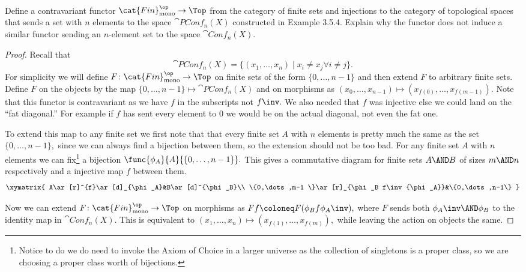 \documentclass[main.tex]{subfiles}
\begin{document}
	\paragraph{}
	\begin{exercise}
		Define a contravariant functor $ \cat{Fin}_{\textrm{mono}}^\op \to
		\Top$ from
		the	category of finite sets and injections to the category of
		topological
		spaces that sends a set with $ n $ elements to the space $
		\cat{PConf}_n(X) $
		constructed in Example 3.5.4. Explain why the functor does not induce a
		similar functor sending an $ n $-element set to the space $ \cat{Conf}_n(X). $
	\end{exercise}

	\begin{proof}
		Recall that
		$$
		\cat{PConf}_n(X)=\{(x_1,\dots,x_n)\mid x_i\neq x_j \forall i\neq j
		\}.
		$$
		For simplicity we will define $ F\colon\cat{Fin}_{\textrm{mono}}^\op
		\to \Top $  on finite sets of the form $ \{0,\dots,n-1\} $ and then
		extend $ F $ to arbitrary finite sets. Define $ F $ on the objects by
		the map $\{0,\dots,n-1\}\mapsto \cat{PConf}_n(X)$ and on morphisms as
		$ (x_0,\dots,x_{n-1})\mapsto (x_{f(0)},\dots, x_{f(m-1)}). $
		Note that this functor is contravariant as we have $f$ in the
		subscripts not $f\inv.$ We also needed that $ f $ was injective else we
		could land on the ``fat diagonal.'' For example if $ f $ has sent every
		element to $ 0 $ we would be on the actual diagonal, not even the fat
		one.

		To extend this map to any finite set we first note that that every
		finite set $ A $ with $ n $ elements
		is pretty much the same as the set $ \{0,\dots,n-1\}, $
		since we can always find a bijection between them, so the
		extension should not be too bad. For any finite set $ A $ with $ n $
		elements we can fix\footnote{Notice to do we do need to invoke the
		Axiom of Choice in a larger universe as the collection of singletons is
		a proper class, so we are choosing a proper class worth of
		bijections.} a bijection $ \func{\phi_A}{A}{\{0,\dots,n-1\}}.$
		This gives a commutative diagram for finite sets $ A\AND B $ of
		sizes $ m\AND n $ respectively and a injective
		map $ f $ between them.
		$$
		\xymatrix{
			A\ar[r]^{f}\ar[d]_{\phi_A}&B\ar[d]^{\phi_B}\\
			\{0,\dots,m-1 \}\ar[r]_{\phi_B f\inv{\phi_A}}&\{0,\dots,n-1\}
		}
		$$

		Now we can extend
		$F\colon\cat{Fin}_{\textrm{mono}}^\op
		\to \Top $
		on morphisms as $ Ff\coloneq F(\phi_B f\phi_A\inv),$
		where $ F $ sends both $\phi_A\inv\AND\phi_B $ to the identity map
		in $ \cat{Conf}_n(X). $
		This is equivalent to $ (x_1,\dots,x_n)\mapsto (x_{f(1)},\dots,
		x_{f(m)}),$ while leaving the action on objects the same.


\end{proof}
\end{document}
